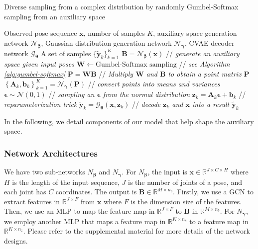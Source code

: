 \documentclass[sigconf,screen,nonacm]{acmart}
\begin{document}
	\begin{algorithm}[!t]
		\caption{Diverse sampling from a complex distribution by randomly Gumbel-Softmax sampling from an auxiliary space}\label{alg:our-sampling-process}
		\begin{algorithmic}[1]
			\Require Observed pose sequence $\mathbf{x}$, number of samples $K$, auxiliary space generation network $\mathcal{N}_{\bm{\beta}}$, Gaussian distribution generation network $\mathcal{N}_{\bm{\gamma}}$, CVAE decoder network $\mathcal{G}_{\bm{\theta}}$
			\Ensure A set of samples $\{\mathbf{\tilde{y}}_k\}_{k=1}^{K}$
			\State $\mathbf{B} = \mathcal{N}_{\bm{\beta}}(\mathbf{x})$ // \textit{generate an auxiliary space given input poses}
			\State $\mathbf{W} \leftarrow \text{Gumbel-Softmax sampling}$ // \textit{see \rm{Algorithm} \ref{alg:gumbel-softmax}}
			\State $\mathbf{P}=\mathbf{W}\mathbf{B}$ // \textit{Multiply $\mathbf{W}$ and $\mathbf{B}$ to obtain a point matrix $\mathbf{P}$}
			\State $\left\{\mathbf{A}_k,\mathbf{b}_k\right\}_{k=1}^K = \mathcal{N}_{\bm{\gamma}}(\mathbf{P})$ // \textit{convert points into means and variances}
			\State $\bm{\epsilon}  \sim \mathcal{N}(0,1)$ // \textit{sampling an $\bm{\epsilon}$ from the normal distribution}
			\State $\mathbf{z}_k  = \mathbf{A}_k \mathbf{\bm{\epsilon}} + \mathbf{b}_k$ // \textit{reparameterization trick}
			\State $\mathbf{\tilde{y}}_k  = \mathcal{G}_{\bm{\theta}}(\mathbf{x},\mathbf{z}_k)$ // \textit{decode $\mathbf{z}_k$ and $\mathbf{x}$ into a result $\mathbf{\tilde{y}}_k$}
			\EndFor 
		\end{algorithmic}
	\end{algorithm}
	
	
	In the following, we detail components of our model that help shape the auxiliary space.
	
	\subsubsection{Network Architectures}
	We have two sub-networks $N_{\bm{\beta}}$ and $N_{\bm{\gamma}}$. For $N_{\bm{\beta}}$, the input is $\mathbf{x}\in\mathbb{R}^{J\times C \times H}$ where $H$ is the length of the input sequence, $J$ is the number of joints of a pose, and each joint has $C$ coordinates. The output is $\mathbf{B}\in\mathbb{R}^{M\times n_b}$. Firstly, we use a GCN \cite{mao2019learning} to extract features in $\mathbb{R}^{J \times F}$ from $\mathbf{x}$ where $F$ is the dimension size of the features. Then, we use an MLP to map the feature map in $\mathbb{R}^{J \times F}$ to $\mathbf{B}$ in $\mathbb{R}^{M\times n_b}$. For $N_{\bm{\gamma}}$, we employ another MLP that maps a feature map in $\mathbb{R}^{K\times n_b}$ to a feature map in $\mathbb{R}^{K\times n_z}$. Please refer to the supplemental material for more details of the network designs.
	
\end{document}
